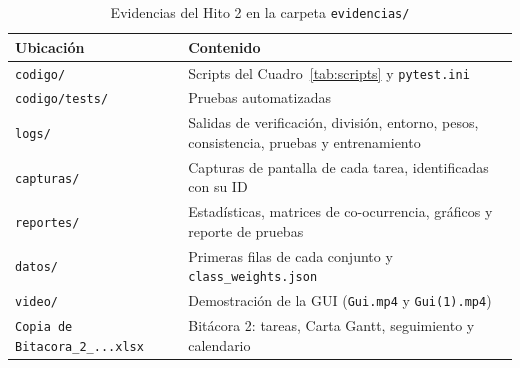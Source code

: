 \documentclass[11.5pt]{article}
\begin{document}
\begin{table}[H]
\centering
\small
\caption{Evidencias del Hito 2 en la carpeta \texttt{evidencias/}}
\label{tab:evidencias}
\begin{tabularx}{\textwidth}{L{5.1cm} X}
\toprule
Ubicación & Contenido \\
\midrule
\texttt{codigo/} & Scripts del Cuadro~\ref{tab:scripts} y \texttt{pytest.ini} \\
\texttt{codigo/tests/} & Pruebas automatizadas \\
\texttt{logs/} & Salidas de verificación, división, entorno, pesos, consistencia, pruebas y entrenamiento \\
\texttt{capturas/} & Capturas de pantalla de cada tarea, identificadas con su ID \\
\texttt{reportes/} & Estadísticas, matrices de co-ocurrencia, gráficos y reporte de pruebas \\
\texttt{datos/} & Primeras filas de cada conjunto y \texttt{class\_weights.json} \\
\texttt{video/} & Demostración de la GUI (\texttt{Gui.mp4} y \texttt{Gui(1).mp4}) \\
\texttt{Copia de Bitacora\_2\_...xlsx} & Bitácora 2: tareas, Carta Gantt, seguimiento y calendario \\
\bottomrule
\end{tabularx}
\end{table}
\end{document}
